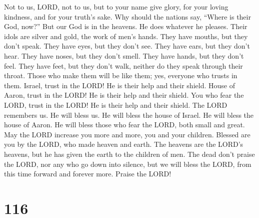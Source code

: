  Not to us, LORD, not to us, but to your name give glory,
for your loving kindness, and for your truth's sake.  Why
should the nations say, ``Where is their God, now?''  But
our God is in the heavens. He does whatever he pleases. 
Their idols are silver and gold, the work of men's hands. 
They have mouths, but they don't speak. They have eyes, but they don't
see.  They have ears, but they don't hear. They have noses,
but they don't smell.  They have hands, but they don't feel.
They have feet, but they don't walk, neither do they speak through their
throat.  Those who make them will be like them; yes,
everyone who trusts in them.  Israel, trust in the LORD! He
is their help and their shield.  House of Aaron, trust in
the LORD! He is their help and their shield.  You who fear
the LORD, trust in the LORD! He is their help and their shield.
 The LORD remembers us. He will bless us. He will bless the
house of Israel. He will bless the house of Aaron.  He will
bless those who fear the LORD, both small and great.  May
the LORD increase you more and more, you and your children.
 Blessed are you by the LORD, who made heaven and earth.
 The heavens are the LORD's heavens, but he has given the
earth to the children of men.  The dead don't praise the
LORD, nor any who go down into silence,  but we will bless
the LORD, from this time forward and forever more. Praise the LORD!

\hypertarget{section-106}{%
\section{116}\label{section-106}}

